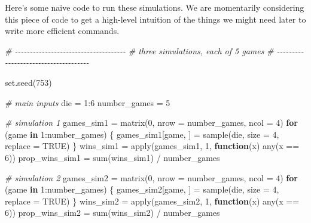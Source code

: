 \documentclass[
]{book}
\newenvironment{Shaded}{\begin{snugshade}}{\end{snugshade}}
\newcommand{\AttributeTok}[1]{\textcolor[rgb]{0.77,0.63,0.00}{#1}}
\newcommand{\CommentTok}[1]{\textcolor[rgb]{0.56,0.35,0.01}{\textit{#1}}}
\newcommand{\ConstantTok}[1]{\textcolor[rgb]{0.00,0.00,0.00}{#1}}
\newcommand{\ControlFlowTok}[1]{\textcolor[rgb]{0.13,0.29,0.53}{\textbf{#1}}}
\newcommand{\DecValTok}[1]{\textcolor[rgb]{0.00,0.00,0.81}{#1}}
\newcommand{\FunctionTok}[1]{\textcolor[rgb]{0.00,0.00,0.00}{#1}}
\newcommand{\NormalTok}[1]{#1}
\newcommand{\OtherTok}[1]{\textcolor[rgb]{0.56,0.35,0.01}{#1}}
\newcommand{\SpecialCharTok}[1]{\textcolor[rgb]{0.00,0.00,0.00}{#1}}
\begin{document}
Here's some naive code to run these simulations. We are momentarily considering
this piece of code to get a high-level intuition of the things we might need
later to write more efficient commands.

\begin{Shaded}
\begin{Highlighting}[]
\CommentTok{\# {-}{-}{-}{-}{-}{-}{-}{-}{-}{-}{-}{-}{-}{-}{-}{-}{-}{-}{-}{-}{-}{-}{-}{-}{-}{-}{-}{-}{-}{-}{-}{-}{-}{-}{-}{-}{-}}
\CommentTok{\# three simulations, each of 5 games}
\CommentTok{\# {-}{-}{-}{-}{-}{-}{-}{-}{-}{-}{-}{-}{-}{-}{-}{-}{-}{-}{-}{-}{-}{-}{-}{-}{-}{-}{-}{-}{-}{-}{-}{-}{-}{-}{-}{-}{-}}

\FunctionTok{set.seed}\NormalTok{(}\DecValTok{753}\NormalTok{)}

\CommentTok{\# main inputs}
\NormalTok{die }\OtherTok{=} \DecValTok{1}\SpecialCharTok{:}\DecValTok{6}
\NormalTok{number\_games }\OtherTok{=} \DecValTok{5}

\CommentTok{\# simulation 1}
\NormalTok{games\_sim1 }\OtherTok{=} \FunctionTok{matrix}\NormalTok{(}\DecValTok{0}\NormalTok{, }\AttributeTok{nrow =}\NormalTok{ number\_games, }\AttributeTok{ncol =} \DecValTok{4}\NormalTok{)}
\ControlFlowTok{for}\NormalTok{ (game }\ControlFlowTok{in} \DecValTok{1}\SpecialCharTok{:}\NormalTok{number\_games) \{}
\NormalTok{  games\_sim1[game, ] }\OtherTok{=} \FunctionTok{sample}\NormalTok{(die, }\AttributeTok{size =} \DecValTok{4}\NormalTok{, }\AttributeTok{replace =} \ConstantTok{TRUE}\NormalTok{)}
\NormalTok{\}}
\NormalTok{wins\_sim1 }\OtherTok{=} \FunctionTok{apply}\NormalTok{(games\_sim1, }\DecValTok{1}\NormalTok{, }\ControlFlowTok{function}\NormalTok{(x) }\FunctionTok{any}\NormalTok{(x }\SpecialCharTok{==} \DecValTok{6}\NormalTok{))}
\NormalTok{prop\_wins\_sim1 }\OtherTok{=} \FunctionTok{sum}\NormalTok{(wins\_sim1) }\SpecialCharTok{/}\NormalTok{ number\_games}


\CommentTok{\# simulation 2}
\NormalTok{games\_sim2 }\OtherTok{=} \FunctionTok{matrix}\NormalTok{(}\DecValTok{0}\NormalTok{, }\AttributeTok{nrow =}\NormalTok{ number\_games, }\AttributeTok{ncol =} \DecValTok{4}\NormalTok{)}
\ControlFlowTok{for}\NormalTok{ (game }\ControlFlowTok{in} \DecValTok{1}\SpecialCharTok{:}\NormalTok{number\_games) \{}
\NormalTok{  games\_sim2[game, ] }\OtherTok{=} \FunctionTok{sample}\NormalTok{(die, }\AttributeTok{size =} \DecValTok{4}\NormalTok{, }\AttributeTok{replace =} \ConstantTok{TRUE}\NormalTok{)}
\NormalTok{\}}
\NormalTok{wins\_sim2 }\OtherTok{=} \FunctionTok{apply}\NormalTok{(games\_sim2, }\DecValTok{1}\NormalTok{, }\ControlFlowTok{function}\NormalTok{(x) }\FunctionTok{any}\NormalTok{(x }\SpecialCharTok{==} \DecValTok{6}\NormalTok{))}
\NormalTok{prop\_wins\_sim2 }\OtherTok{=} \FunctionTok{sum}\NormalTok{(wins\_sim2) }\SpecialCharTok{/}\NormalTok{ number\_games}



\end{Highlighting}
\end{Shaded}
\end{document}
